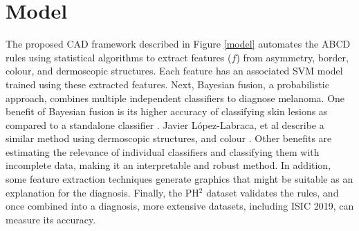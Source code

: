 \documentclass[10.5pt]{report}
\begin{document}
\section{Model}
The proposed CAD framework described in Figure \ref{model} automates the ABCD rules using statistical algorithms to extract features ($f$) from asymmetry, border, colour, and dermoscopic structures. Each feature has an associated SVM model trained using these extracted features. Next, Bayesian fusion, a probabilistic approach, combines multiple independent classifiers to diagnose melanoma. One benefit of Bayesian fusion is its higher accuracy of classifying skin lesions as compared to a standalone classifier \cite{Takruri2017}.  Javier López-Labraca, et al describe a similar method using dermoscopic structures, and colour \cite{Lopez-Labraca2018}. Other benefits are estimating the relevance of individual classifiers and classifying them with incomplete data, making it an interpretable and robust method. In addition, some feature extraction techniques generate graphics that might be suitable as an explanation for the diagnosis. Finally, the PH$^2$ dataset validates the rules, and once combined into a diagnosis, more extensive datasets, including ISIC 2019, can measure its accuracy.
\end{document}
